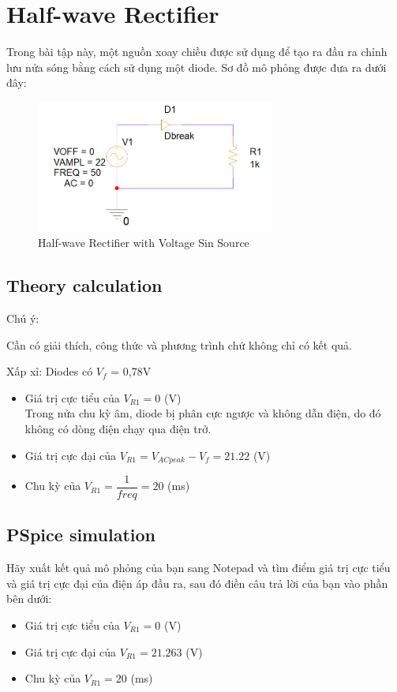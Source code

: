 \section{Half-wave Rectifier}

Trong bài tập này, một nguồn xoay chiều được sử dụng để tạo ra đầu ra chỉnh lưu nửa sóng bằng cách sử dụng một diode. Sơ đồ mô phỏng được đưa ra dưới đây:

\begin{figure}[h]
    \centering
    \includegraphics[width=0.7\textwidth]{graphics/ex6/f1.PNG}
    \caption{Half-wave Rectifier with Voltage Sin Source}
\end{figure}

\subsection{Theory calculation}

Chú ý:

Cần có giải thích, công thức và phương trình chứ không chỉ có kết quả.

Xấp xỉ: Diodes có \(V_f\) = 0,78V

\begin{itemize}
    \item Giá trị cực tiểu của \(V_{R1} = 0\) (V) \\
        Trong nửa chu kỳ âm, diode bị phân cực ngược và không dẫn điện, do đó không có dòng điện chạy qua điện trở.
    \item Giá trị cực đại của \(V_{R1} = V_{ACpeak} - V_f = 21.22\) (V) 
    \item Chu kỳ của \(V_{R1} =  \dfrac{1}{freq} = 20\) (ms)
\end{itemize}

\subsection{PSpice simulation}

Hãy xuất kết quả mô phỏng của bạn sang Notepad và tìm điểm giá trị cực tiểu và giá trị cực đại của điện áp đầu ra, sau đó điền câu trả lời của bạn vào phần bên dưới:

\begin{itemize}
    \item Giá trị cực tiểu của \(V_{R1} = 0\) (V)
    \item Giá trị cực đại của \(V_{R1} = 21.263\) (V)
    \item Chu kỳ của \(V_{R1} = 20\) (ms)
\end{itemize}